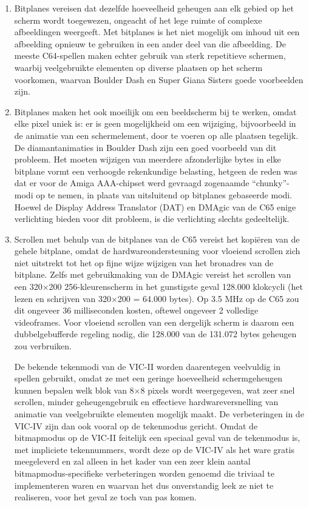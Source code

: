 \begin{enumerate}
\item Bitplanes vereisen dat dezelfde hoeveelheid geheugen aan elk gebied op het scherm wordt toegewezen, ongeacht of het lege ruimte of complexe afbeeldingen weergeeft. Met bitplanes is het niet mogelijk om inhoud uit een afbeelding opnieuw te gebruiken in een ander deel van die afbeelding. De meeste C64-spellen maken echter gebruik van sterk repetitieve schermen, waarbij veelgebruikte elementen op diverse plaatsen op het scherm voorkomen, waarvan Boulder Dash en Super Giana Sisters goede voorbeelden zijn.

\item Bitplanes maken het ook moeilijk om een beeldscherm bij te werken, omdat elke pixel uniek is: er is geen mogelijkheid om een wijziging, bijvoorbeeld in de animatie van een schermelement, door te voeren op alle plaatsen tegelijk. De diamantanimaties in Boulder Dash zijn een goed voorbeeld van dit probleem. Het moeten wijzigen van meerdere afzonderlijke bytes in elke bitplane vormt een verhoogde rekenkundige belasting, hetgeen de reden was dat er voor de Amiga AAA-chipset werd gevraagd zogenaamde ``chunky''-modi op te nemen, in plaats van uitsluitend op bitplanes gebaseerde modi. Hoewel de Display Address Translator (DAT) en DMAgic van de C65 enige verlichting bieden voor dit probleem, is die verlichting slechts gedeeltelijk.

\item Scrollen met behulp van de bitplanes van de C65 vereist het kopiëren van de gehele bitplane, omdat de hardwareondersteuning voor vloeiend scrollen zich niet uitstrekt tot het op fijne wijze wijzigen van het bronadres van de bitplane. Zelfs met gebruikmaking van de DMAgic vereist het scrollen van een 320$\times$200 256-kleurenscherm in het gunstigste geval 128.000 klokcycli (het lezen en schrijven van 320$\times$200 = 64.000 bytes). Op 3.5 MHz op de C65 zou dit ongeveer 36 milliseconden kosten, oftewel ongeveer 2 volledige videoframes. Voor vloeiend scrollen van een dergelijk scherm is daarom een dubbelgebufferde regeling nodig, die 128.000 van de 131.072 bytes geheugen zou verbruiken.

De bekende tekenmodi van de VIC-II worden daarentegen veelvuldig in spellen gebruikt, omdat ze met een geringe hoeveelheid schermgeheugen kunnen bepalen welk blok van 8$\times$8 pixels wordt weergegeven, wat zeer snel scrollen, minder geheugengebruik en effectieve hardwareversnelling van animatie van veelgebruikte elementen mogelijk maakt. De verbeteringen in de VIC-IV zijn dan ook vooral op de tekenmodus gericht. Omdat de bitmapmodus op de VIC-II feitelijk een speciaal geval van de tekenmodus is, met impliciete tekennummers, wordt deze op de VIC-IV als het ware gratis meegeleverd en zal alleen in het kader van een zeer klein aantal bitmapmodus-specifieke verbeteringen worden genoemd die triviaal te implementeren waren en waarvan het dus onverstandig leek ze niet te realiseren, voor het geval ze toch van pas komen.

\end{enumerate}


